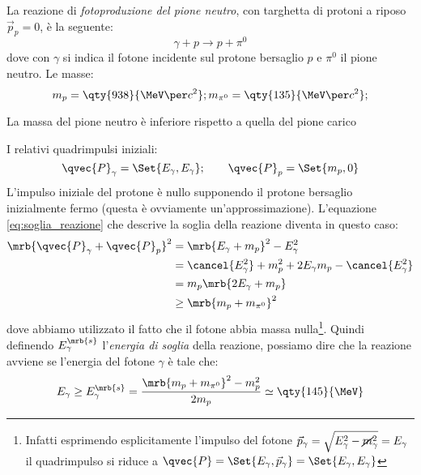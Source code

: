 \begin{example}
	La reazione di \textit{fotoproduzione del pione neutro}, con targhetta di
	protoni a riposo $\vec{p}_{p} = 0$, è la seguente:
	\begin{equation}
		\gamma + p \longrightarrow p + \pi^0
	\end{equation}
	dove con $\gamma$ si indica il fotone incidente sul protone bersaglio $p$ e
	$\pi^0$ il pione neutro. Le masse:
	\begin{equation}
		m_p = \qty{938}{\MeV \per c^2};
		\\
		m_{\pi^0} = \qty{135}{\MeV \per c^2};
	\end{equation}

	\begin{note}[]
		La massa del pione neutro è inferiore rispetto a quella del pione carico
	\end{note}

	I relativi quadrimpulsi iniziali:
	\begin{equation}
		\qvec{P}_\gamma = \Set{E_\gamma, E_\gamma};
		\qquad
		\qvec{P}_p = \Set{m_p, 0}
	\end{equation}
	L'impulso iniziale del protone è nullo supponendo il protone bersaglio
	inizialmente fermo (questa è ovviamente un'approssimazione).
	L'equazione \ref{eq:soglia_reazione} che descrive la soglia della reazione
	diventa in questo caso:
	\begin{align}
		\mrb{\qvec{P}_\gamma + \qvec{P}_p}^2
		 & = \mrb{E_\gamma + m_p}^2 - E_\gamma^2
		\\\notag
		 & = \cancel{E_\gamma^2} + m_p^2 + 2 E_\gamma m_p - \cancel{E_\gamma^2}
		\\\notag
		 & = m_p\mrb{2E_\gamma + m_p}
		\\\notag
		 & \geq \mrb{m_p + m_{\pi^0}}^2
	\end{align}
	dove abbiamo utilizzato il fatto che il fotone abbia massa nulla\footnote{
		Infatti esprimendo esplicitamente l'impulso del fotone $\vec{p}_\gamma =
			\sqrt{E_\gamma^2 - \cancel m_\gamma^2} = E_\gamma$
		il quadrimpulso si riduce a
		$\qvec{P} = \Set{E _{\gamma}, \vec{p}_{\gamma}} = \Set{E _{\gamma}, E
					_{\gamma}}$
	}.
	Quindi definendo $E_\gamma^{\mrb{s}}$ l'\textit{energia di soglia} della
	reazione, possiamo dire che la reazione avviene se l'energia del fotone
	$\gamma$ è tale che:
	\begin{equation}
		E_\gamma
		\geq E_\gamma^{\mrb{s}}
		= \frac{\mrb{m_p + m_{\pi^0}}^2 - m_p^2}{2m_p}
		\simeq \qty{145}{\MeV}
	\end{equation}
\end{example}

